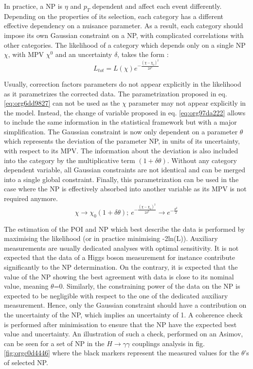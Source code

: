 In practice, a NP is $\eta$ and $p_T$ dependent and affect each event differently.
Depending on the properties of its selection, each category has a different effective dependency on a nuisance parameter.
As a result, each category should impose its own Gaussian constraint on a NP, with complicated correlations with other categories.
The likelihood of a category which depends only on a single NP \(\chi\), with MPV \(\chi^{\text{0}}\) and an uncertainty \(\delta\),  takes the form :
\begin{equation}
\label{eq:org6dd9827}
L_{tot} = L(\chi)e^{-\frac{(\chi-\chi_0)^2}{2\delta^2}}
\end{equation}


Usually, correction factors parameters do not appear explicitly in the likelihood as it parametrizes the corrected data.
The parametrization proposed in eq. \ref{eq:org6dd9827} can not be used as the \(\chi\) parameter may not appear explicitly in the model.
Instead, the change of variable proposed in eq. \ref{eq:org97da222}  allows to include the same information in the statistical framework but with a major simplification.
The Gaussian constraint is now only dependent on a parameter \(\theta\) which represents the deviation of the parameter NP, in units of its uncertainty, with respect to its MPV.
The information about the deviation is also included into the category by the multiplicative term $(1+\delta \theta)$.
Without any category dependent variable, all Gaussian constraints are not identical and can be merged into a single global constraint.
Finally, this parametrization can be used in the case where the NP is effectively absorbed into another variable as its MPV is not required anymore.
\begin{equation}
\label{eq:org97da222}
\chi \rightarrow \chi_0 (1+\delta\theta); \ e^{-\frac{(\chi-\chi_0)^2}{2\delta^2}} \rightarrow e^{-\frac{\theta^2}{2}}
\end{equation}


The estimation of the POI and NP which best describe the data is performed by maximising the likelihood (or in practice minimising -2ln(L)).
Auxiliary measurements are usually dedicated analyses with optimal sensitivity.
It is not expected that the data of a Higgs boson measurement for instance contribute significantly to the NP determination.
On the contrary, it is expected that the value of the NP showing the best agreement with data is close to its nominal value, meaning \(\theta\)=0.
Similarly, the constraining power of the data on the NP is expected to be negligible with respect to the one of the dedicated auxiliary measurement.
Hence, only the Gaussian constraint should have a contribution on the uncertainty of the NP, which implies an uncertainty of 1.
A coherence check is performed after minimisation to ensure that the NP have the expected best value and uncertainty.
An illustration of such a check, performed on an Asimov, can be seen for a set of NP in the $H\rightarrow\gamma\gamma$ couplings analysis in fig. \ref{fig:orgc0d4446} where the black markers represent the measured values for the \(\theta\)'s of selected NP.


